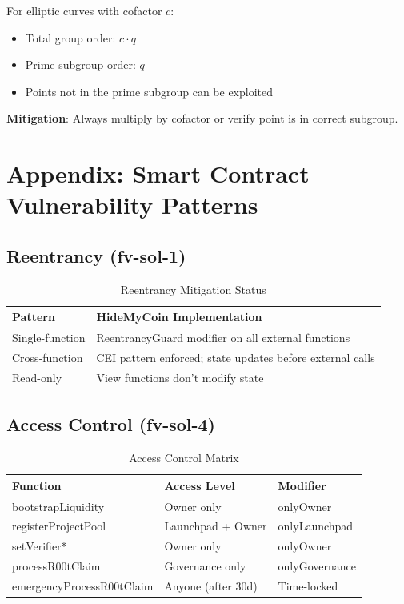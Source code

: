 \documentclass[11pt,a4paper]{article}
\begin{document}
For elliptic curves with cofactor $c$:
\begin{itemize}
    \item Total group order: $c \cdot q$
    \item Prime subgroup order: $q$
    \item Points not in the prime subgroup can be exploited
\end{itemize}

\textbf{Mitigation}: Always multiply by cofactor or verify point is in correct subgroup.

\section{Appendix: Smart Contract Vulnerability Patterns}

\subsection{Reentrancy (fv-sol-1)}

\begin{table}[H]
\centering
\begin{tabular}{|l|p{8cm}|}
\hline
\textbf{Pattern} & \textbf{HideMyCoin Implementation} \\
\hline
Single-function & ReentrancyGuard modifier on all external functions \\
Cross-function & CEI pattern enforced; state updates before external calls \\
Read-only & View functions don't modify state \\
\hline
\end{tabular}
\caption{Reentrancy Mitigation Status}
\end{table}

\subsection{Access Control (fv-sol-4)}

\begin{table}[H]
\centering
\begin{tabular}{|l|l|l|}
\hline
\textbf{Function} & \textbf{Access Level} & \textbf{Modifier} \\
\hline
bootstrapLiquidity & Owner only & onlyOwner \\
registerProjectPool & Launchpad + Owner & onlyLaunchpad \\
setVerifier* & Owner only & onlyOwner \\
processR00tClaim & Governance only & onlyGovernance \\
emergencyProcessR00tClaim & Anyone (after 30d) & Time-locked \\
\hline
\end{tabular}
\caption{Access Control Matrix}
\end{table}
\end{document}
